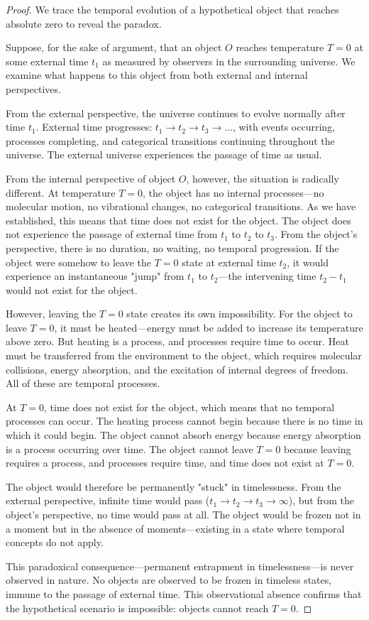 \documentclass[12pt,a4paper]{article}
\theoremstyle{definition}
\theoremstyle{remark}
\begin{document}
\begin{proof}
We trace the temporal evolution of a hypothetical object that reaches absolute zero to reveal the paradox.

Suppose, for the sake of argument, that an object $O$ reaches temperature $T = 0$ at some external time $t_1$ as measured by observers in the surrounding universe. We examine what happens to this object from both external and internal perspectives.

From the external perspective, the universe continues to evolve normally after time $t_1$. External time progresses: $t_1 \to t_2 \to t_3 \to \ldots$, with events occurring, processes completing, and categorical transitions continuing throughout the universe. The external universe experiences the passage of time as usual.

From the internal perspective of object $O$, however, the situation is radically different. At temperature $T = 0$, the object has no internal processes—no molecular motion, no vibrational changes, no categorical transitions. As we have established, this means that time does not exist for the object. The object does not experience the passage of external time from $t_1$ to $t_2$ to $t_3$. From the object's perspective, there is no duration, no waiting, no temporal progression. If the object were somehow to leave the $T = 0$ state at external time $t_2$, it would experience an instantaneous "jump" from $t_1$ to $t_2$—the intervening time $t_2 - t_1$ would not exist for the object.

However, leaving the $T = 0$ state creates its own impossibility. For the object to leave $T = 0$, it must be heated—energy must be added to increase its temperature above zero. But heating is a process, and processes require time to occur. Heat must be transferred from the environment to the object, which requires molecular collisions, energy absorption, and the excitation of internal degrees of freedom. All of these are temporal processes.

At $T = 0$, time does not exist for the object, which means that no temporal processes can occur. The heating process cannot begin because there is no time in which it could begin. The object cannot absorb energy because energy absorption is a process occurring over time. The object cannot leave $T = 0$ because leaving requires a process, and processes require time, and time does not exist at $T = 0$.

The object would therefore be permanently "stuck" in timelessness. From the external perspective, infinite time would pass ($t_1 \to t_2 \to t_3 \to \infty$), but from the object's perspective, no time would pass at all. The object would be frozen not in a moment but in the absence of moments—existing in a state where temporal concepts do not apply.

This paradoxical consequence—permanent entrapment in timelessness—is never observed in nature. No objects are observed to be frozen in timeless states, immune to the passage of external time. This observational absence confirms that the hypothetical scenario is impossible: objects cannot reach $T = 0$.
\end{proof}
\end{document}

